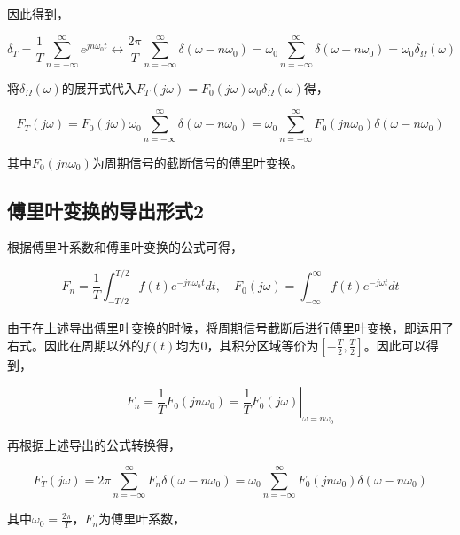 \documentclass[UTF8]{article}
\theoremstyle{definition}
\begin{document}
因此得到，

\begin{equation*}
\delta_T = \frac{1}{T}\sum_{n=-\infty}^{\infty} e^{jn\omega_0t} \leftrightarrow \frac{2\pi}{T} \sum_{n=-\infty}^{\infty}\delta(\omega - n\omega_0)  = \omega_0 \sum_{n=-\infty}^{\infty}\delta(\omega - n\omega_0)=\omega_0 \delta_{\Omega}(\omega)
\end{equation*}

\vspace*{0.5cm}

将$\delta_{\Omega}(\omega)$的展开式代入$F_T(j \omega)=F_0(j \omega) \omega_0 \delta_{\Omega}(\omega)$得，

\begin{equation*}
F_T(j \omega)=F_0(j \omega) \omega_0 \sum_{n=-\infty}^{\infty} \delta\left(\omega-n \omega_0\right)=\omega_0 \sum_{n=-\infty}^{\infty} F_0\left(j n \omega_0\right) \delta\left(\omega-n \omega_0\right)
\end{equation*}

其中$F_0\left(j n \omega_0\right)$为周期信号的截断信号的傅里叶变换。


\subsection{傅里叶变换的导出形式2}
根据傅里叶系数和傅里叶变换的公式可得，

\begin{equation*}
F_n=\frac{1}{T} \int_{-T / 2}^{T / 2} f(t) e^{-j n \omega_0 t} d t,\quad F_0(j\omega) 
=\int_{-\infty}^{\infty} f(t) e^{-j \omega t} d t
\end{equation*}

由于在上述导出傅里叶变换的时候，将周期信号截断后进行傅里叶变换，即运用了右式。因此在周期以外的$f(t)$均为0，其积分区域等价为$[ -\frac{T}{2},\frac{T}{2} ]$。因此可以得到，

\begin{equation*}
F_n=\frac{1}{T} F_0(j n \omega_0)=\left.\frac{1}{T} F_0(j \omega)\right|_{\omega=n \omega_0}
\end{equation*}

再根据上述导出的公式转换得，

\begin{equation*}
F_T(j \omega)= 2\pi \sum_{n=-\infty}^{\infty} F_n\delta(\omega-n\omega_0)=\omega_0 \sum_{n=-\infty}^{\infty} F_0\left(j n \omega_0\right) \delta\left(\omega-n \omega_0\right) 
\end{equation*}

其中$\omega_0 = \frac{2\pi}{T}$，$F_n$为傅里叶系数，
\end{document}

